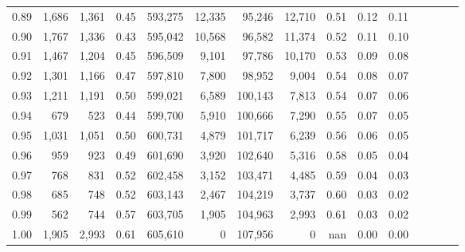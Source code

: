 \begin{tabular}{rrrcrrrrrrrrrrr}
0.89 &   1,686 &  1,361 &                                       0.45 &  593,275 &   12,335 &   95,246 &   12,710 &  0.51 &  0.12 &                         0.11 \\
0.90 &   1,767 &  1,336 &                                       0.43 &  595,042 &   10,568 &   96,582 &   11,374 &  0.52 &  0.11 &                         0.10 \\
0.91 &   1,467 &  1,204 &                                       0.45 &  596,509 &    9,101 &   97,786 &   10,170 &  0.53 &  0.09 &                         0.08 \\
0.92 &   1,301 &  1,166 &                                       0.47 &  597,810 &    7,800 &   98,952 &    9,004 &  0.54 &  0.08 &                         0.07 \\
0.93 &   1,211 &  1,191 &                                       0.50 &  599,021 &    6,589 &  100,143 &    7,813 &  0.54 &  0.07 &                         0.06 \\
0.94 &     679 &    523 &                                       0.44 &  599,700 &    5,910 &  100,666 &    7,290 &  0.55 &  0.07 &                         0.05 \\
0.95 &   1,031 &  1,051 &                                       0.50 &  600,731 &    4,879 &  101,717 &    6,239 &  0.56 &  0.06 &                         0.05 \\
0.96 &     959 &    923 &                                       0.49 &  601,690 &    3,920 &  102,640 &    5,316 &  0.58 &  0.05 &                         0.04 \\
0.97 &     768 &    831 &                                       0.52 &  602,458 &    3,152 &  103,471 &    4,485 &  0.59 &  0.04 &                         0.03 \\
0.98 &     685 &    748 &                                       0.52 &  603,143 &    2,467 &  104,219 &    3,737 &  0.60 &  0.03 &                         0.02 \\
0.99 &     562 &    744 &                                       0.57 &  603,705 &    1,905 &  104,963 &    2,993 &  0.61 &  0.03 &                         0.02 \\
1.00 &   1,905 &  2,993 &                                       0.61 &  605,610 &        0 &  107,956 &        0 &   nan &  0.00 &                         0.00 \\
\bottomrule
\end{tabular}
